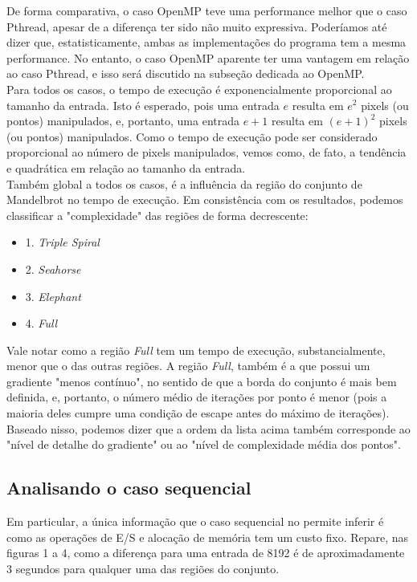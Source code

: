 \documentclass[a4paper, 12pt]{article}
\begin{document}
De forma comparativa, o caso OpenMP teve uma performance melhor que o caso Pthread, apesar de a diferença ter sido não muito expressiva. Poderíamos até dizer que, estatisticamente, ambas as implementações do programa tem a mesma performance. No entanto, o caso OpenMP aparente ter uma vantagem em relação ao caso Pthread, e isso será discutido na subseção dedicada ao OpenMP.\\

Para todos os casos, o tempo de execução é exponencialmente proporcional ao tamanho da entrada. Isto é esperado, pois uma entrada $e$ resulta em $e^2$ pixels (ou pontos) manipulados, e, portanto, uma entrada $e+1$ resulta em $(e+1)^2$ pixels (ou pontos) manipulados. Como o tempo de execução pode ser considerado proporcional ao número de pixels manipulados, vemos como, de fato, a tendência e quadrática em relação ao tamanho da entrada.\\

Também global a todos os casos, é a influência da região do conjunto de Mandelbrot no tempo de execução. Em consistência com os resultados, podemos classificar a "complexidade" das regiões de forma decrescente:
\begin{itemize}
\item 1. \textit{Triple Spiral}
\item 2. \textit{Seahorse}
\item 3. \textit{Elephant}
\item 4. \textit{Full}
\end{itemize}

Vale notar como a região \textit{Full} tem um tempo de execução, substancialmente, menor que o das outras regiões. A região \textit{Full}, também é a que possui um gradiente "menos contínuo", no sentido de que a borda do conjunto é mais bem definida, e, portanto, o número médio de iterações por ponto é menor (pois a maioria deles cumpre uma condição de escape antes do máximo de iterações). Baseado nisso, podemos dizer que a ordem da lista acima também corresponde ao "nível de detalhe do gradiente" ou ao "nível de complexidade média dos pontos".

\subsection{Analisando o caso sequencial}

Em particular, a única informação que o caso sequencial no permite inferir é como as operações de E/S e alocação de memória tem um custo fixo. Repare, nas figuras 1 a 4, como a diferença para uma entrada de 8192 é de aproximadamente 3 segundos para qualquer uma das regiões do conjunto.\\
\end{document}
